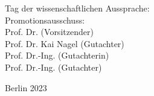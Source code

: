 \begin{flushright}
	\hrulefill

 	Tag der wissenschaftlichen Aussprache:  \\

	\vspace{5mm}
	Promotionsausschuss:\\
	Prof. Dr. (Vorsitzender)\\
    	Prof. Dr. Kai Nagel (Gutachter)\\
    	Prof. Dr.-Ing.  (Gutachterin)\\
     	Prof. Dr.-Ing. (Gutachter)\\
	\vspace{10mm}

	Berlin 2023\\

\end{flushright}